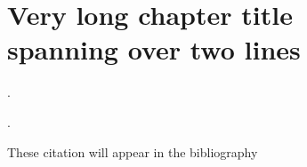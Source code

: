 \chapter[Shorter Title for ToC and header]{Very long chapter title\\spanning over two lines}
\label{ch:chapter1}

\begin{abstract} %
\blindtext
\end{abstract}

\begin{basedon}%
\item {}.
\item {}.
\end{basedon}

\newpage %
These citation will appear in the bibliography\cite{einstein1905, latexcompanion1993, mypublication2}

\blindmathpaper